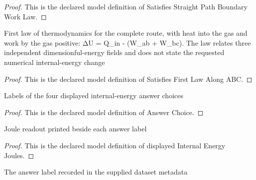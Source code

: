 \begin{proof}
  This is the declared model definition of Satisfies Straight Path Boundary Work Law.
\end{proof}
\begin{definition}
  \label{def:physics:phyx-mini-0337:phyxminiproblems-problemphyxmini0337-satisfiesfirstlawalongabc}
  First law of thermodynamics for the complete route, with heat into the gas and work by the gas positive: ΔU = Q\_in - (W\_ab + W\_bc). The law relates three independent dimensionful-energy fields and does not state the requested numerical internal-energy change
\end{definition}
\begin{proof}
  This is the declared model definition of Satisfies First Law Along ABC.
\end{proof}
\begin{definition}
  \label{def:physics:phyx-mini-0337:phyxminiproblems-problemphyxmini0337-answerchoice}
  Labels of the four displayed internal-energy answer choices
\end{definition}
\begin{proof}
  This is the declared model definition of Answer Choice.
\end{proof}
\begin{definition}
  \label{def:physics:phyx-mini-0337:phyxminiproblems-problemphyxmini0337-displayedinternalenergyjoules}
  Joule readout printed beside each answer label
\end{definition}
\begin{proof}
  This is the declared model definition of displayed Internal Energy Joules.
\end{proof}
\begin{definition}
  \label{def:physics:phyx-mini-0337:phyxminiproblems-problemphyxmini0337-recordedanswerchoice}
  The answer label recorded in the supplied dataset metadata
\end{definition}
